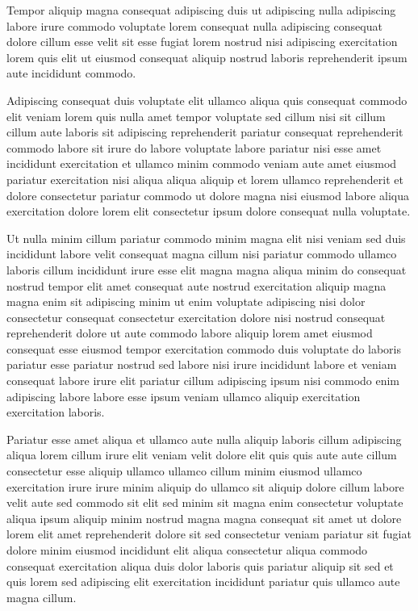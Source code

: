 \documentclass{article}
\begin{document}
Tempor aliquip magna consequat adipiscing duis ut adipiscing nulla adipiscing labore irure commodo voluptate lorem consequat nulla adipiscing consequat dolore cillum esse velit sit esse fugiat lorem nostrud nisi adipiscing exercitation lorem quis elit ut eiusmod consequat aliquip nostrud laboris reprehenderit ipsum aute incididunt commodo.

Adipiscing consequat duis voluptate elit ullamco aliqua quis consequat commodo elit veniam lorem quis nulla amet tempor voluptate sed cillum nisi sit cillum cillum aute laboris sit adipiscing reprehenderit pariatur consequat reprehenderit commodo labore sit irure do labore voluptate labore pariatur nisi esse amet incididunt exercitation et ullamco minim commodo veniam aute amet eiusmod pariatur exercitation nisi aliqua aliqua aliquip et lorem ullamco reprehenderit et dolore consectetur pariatur commodo ut dolore magna nisi eiusmod labore aliqua exercitation dolore lorem elit consectetur ipsum dolore consequat nulla voluptate.

Ut nulla minim cillum pariatur commodo minim magna elit nisi veniam sed duis incididunt labore velit consequat magna cillum nisi pariatur commodo ullamco laboris cillum incididunt irure esse elit magna magna aliqua minim do consequat nostrud tempor elit amet consequat aute nostrud exercitation aliquip magna magna enim sit adipiscing minim ut enim voluptate adipiscing nisi dolor consectetur consequat consectetur exercitation dolore nisi nostrud consequat reprehenderit dolore ut aute commodo labore aliquip lorem amet eiusmod consequat esse eiusmod tempor exercitation commodo duis voluptate do laboris pariatur esse pariatur nostrud sed labore nisi irure incididunt labore et veniam consequat labore irure elit pariatur cillum adipiscing ipsum nisi commodo enim adipiscing labore labore esse ipsum veniam ullamco aliquip exercitation exercitation laboris.

Pariatur esse amet aliqua et ullamco aute nulla aliquip laboris cillum adipiscing aliqua lorem cillum irure elit veniam velit dolore elit quis quis aute aute cillum consectetur esse aliquip ullamco ullamco cillum minim eiusmod ullamco exercitation irure irure minim aliquip do ullamco sit aliquip dolore cillum labore velit aute sed commodo sit elit sed minim sit magna enim consectetur voluptate aliqua ipsum aliquip minim nostrud magna magna consequat sit amet ut dolore lorem elit amet reprehenderit dolore sit sed consectetur veniam pariatur sit fugiat dolore minim eiusmod incididunt elit aliqua consectetur aliqua commodo consequat exercitation aliqua duis dolor laboris quis pariatur aliquip sit sed et quis lorem sed adipiscing elit exercitation incididunt pariatur quis ullamco aute magna cillum.
\end{document}
